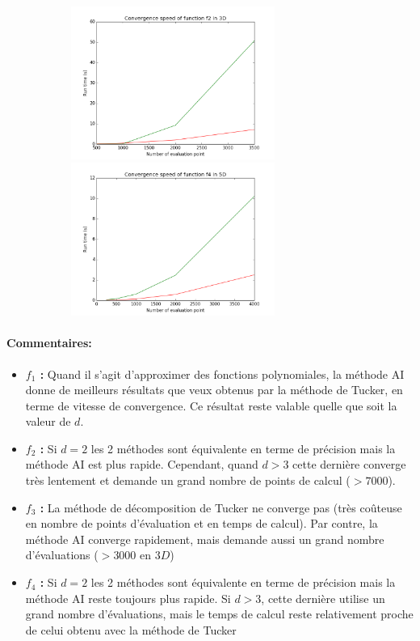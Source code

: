\begin{center}
\begin{figure}[!h]
		~
		\begin{subfigure}[b]{0.3\textwidth}
				\includegraphics[width=\linewidth,height=5cm]{images/f2_3d_s.png}
				\includegraphics[width=\linewidth,height=5cm]{images/f4_5d_s.png}
		\end{subfigure}
		\label{figure:runtime}
\end{figure}
\label{figure:runtime}
\end{center}

\newpage

\paragraph{Commentaires:}
\begin{itemize}
	\item \textbf{$f_1$ :} Quand il s'agit d'approximer des fonctions polynomiales, la méthode AI donne de meilleurs résultats que veux obtenus par la méthode de Tucker, en terme de vitesse de convergence. Ce résultat reste valable quelle que soit la valeur de $d$.
	\item \textbf{$f_2$ :} Si $d=2$ les 2 méthodes sont équivalente en terme de précision mais la méthode AI est plus rapide. Cependant, quand $d>3$ cette dernière converge très lentement et demande un grand nombre de points de calcul ($>7000$).
	\item \textbf{$f_3$ :} La méthode de décomposition de Tucker ne converge pas (très coûteuse en nombre de points d'évaluation et en temps de calcul). Par contre, la méthode AI converge rapidement, mais demande aussi un grand nombre d’évaluations ($>3000$ en $3D$)
	\item \textbf{$f_4$ :} Si $d=2$ les 2 méthodes sont équivalente en terme de précision mais la méthode AI reste toujours plus rapide. Si $d>3$, cette dernière utilise un grand nombre d’évaluations, mais le temps de calcul reste relativement proche de celui obtenu avec la méthode de Tucker
\end{itemize}
